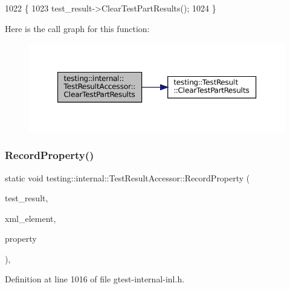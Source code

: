\begin{DoxyCode}
1022                                                             \{
1023     test\_result->ClearTestPartResults();
1024   \}
\end{DoxyCode}
Here is the call graph for this function\+:
\nopagebreak
\begin{figure}[H]
\begin{center}
\leavevmode
\includegraphics[width=350pt]{classtesting_1_1internal_1_1TestResultAccessor_a53c626632bac65d82d88e432072b866b_cgraph}
\end{center}
\end{figure}
\mbox{\label{classtesting_1_1internal_1_1TestResultAccessor_abcc4b32d1b201eeef92f0ec0ae161cf9}} 
\subsubsection{\texorpdfstring{Record\+Property()}{RecordProperty()}}
{\footnotesize\ttfamily static void testing\+::internal\+::\+Test\+Result\+Accessor\+::\+Record\+Property (\begin{DoxyParamCaption}\item[{\hyperlink{classtesting_1_1TestResult}{Test\+Result} $\ast$}]{test\+\_\+result,  }\item[{const std\+::string \&}]{xml\+\_\+element,  }\item[{const \hyperlink{classtesting_1_1TestProperty}{Test\+Property} \&}]{property }\end{DoxyParamCaption})\hspace{0.3cm}{\ttfamily [inline]}, {\ttfamily [static]}}



Definition at line 1016 of file gtest-\/internal-\/inl.\+h.



